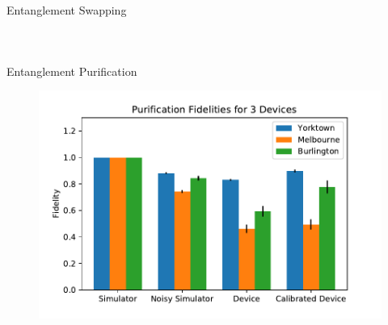 \begin{frame}{Entanglement Swapping}
\begin{columns}
\begin{figure}
	\end{figure}
\end{columns}
\end{frame}

\begin{frame}{Entanglement Purification}
\begin{figure}
	\includegraphics[width=1\textwidth]{images/results/purification_histogram.pdf}
\end{figure}
\end{frame}

